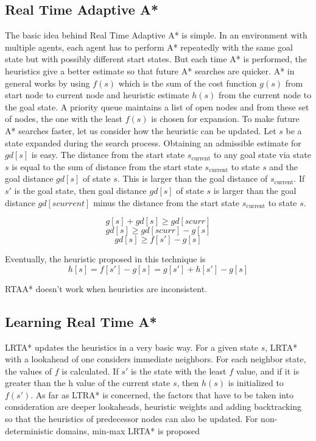 \documentclass[tog]{acmsiggraph}
\begin{document}
\subsection{Real Time Adaptive A*}

The basic idea behind Real Time Adaptive A* is simple. In an
environment with multiple agents, each agent has to perform A*
repeatedly with the same goal state but with possibly different start
states. But each time A* is performed, the heuristics give a better
estimate so that future A* searches are quicker. A* in general works
by using \(f(s)\) which is the sum of the cost function \(g(s)\) from
start node to current node and heuristic estimate \(h(s)\) from the
current node to the goal state. A priority queue maintains a list of
open nodes and from these set of nodes, the one with the least
\(f(s)\) is chosen for expansion. To make future A* searches faster,
let us consider how the heuristic can be updated. Let \(s\) be a state
expanded during the search process. Obtaining an admissible estimate
for \(gd[s]\) is easy. The distance from the start state
\(s_\text{current}\) to any goal state via state \(s\) is equal to the
sum of distance from the start state \(s_\text{current}\) to state
\(s\) and the goal distance \(gd[s]\) of state \(s\). This is larger
than the goal distance of \(s_\text{current}\). If \(s'\) is the goal
state, then goal distance \(gd[s]\) of state \(s\) is larger than the
goal distance \(gd[scurrent]\) minus the distance from the start state
\(s_\text{current}\) to state \(s\).

\[ g[s] + gd[s] \geq gd[scurr] \]
\[ gd[s] \geq gd[scurr] - g[s] \]
\[ gd[s] \geq f[s'] - g[s] \]

Eventually, the heuristic proposed in this technique is
\[ h[s] = f[s'] - g[s] = g[s'] + h[s'] - g[s] \]

RTAA* doesn’t work when heuristics are inconsistent.

\subsection{Learning Real Time A*}

LRTA* updates the heuristics in a very basic way. For a given state
\(s\), LRTA* with a lookahead of one considers immediate neighbors.
For each neighbor state, the values of \(f\) is calculated. If \(s'\)
is the state with the least \(f\) value, and if it is greater than the
h value of the current state \(s\), then \(h(s)\) is initialized to
\(f(s')\). As far as LTRA* is concerned, the factors that have to be
taken into consideration are deeper lookaheads, heuristic weights and
adding backtracking so that the heuristics of predecessor nodes can
also be updated. For non-deterministic domains, min-max LRTA* is
proposed


\nocite{*}

\end{document}
